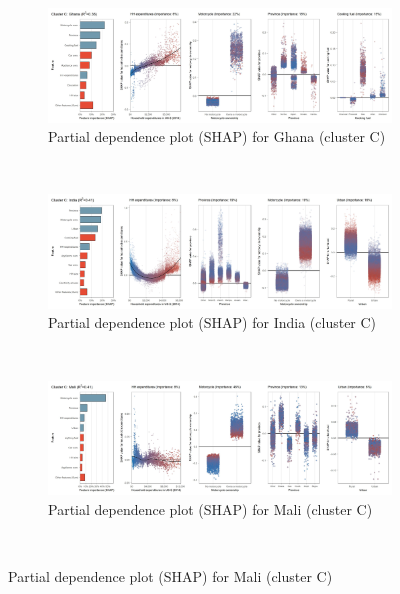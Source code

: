 \begin{figure}[ht!]\ContinuedFloat
    \centering
   \begin{subfigure}[b]{\textwidth} 
   \centering
         \caption{Partial dependence plot (SHAP) for Ghana (cluster C)}
         \label{fig:5b_GHA}
         \includegraphics[width=\textwidth]{Figure 5b/Figure_5b_GHA}
         \end{subfigure}
    \\
    \vspace{0.5cm}
    \begin{subfigure}[b]{\textwidth}
    \centering
         \caption{Partial dependence plot (SHAP) for India (cluster C)}
         \label{fig:5b_IND}
         \includegraphics[width=\textwidth]{Figure 5b/Figure_5b_IND}    
   \end{subfigure}
    \\
    \vspace{0.5cm}
   \begin{subfigure}[b]{\textwidth}
   \centering
         \caption{Partial dependence plot (SHAP) for Mali (cluster C)}
         \label{fig:5b_MLI}
         \includegraphics[width=\textwidth]{Figure 5b/Figure_5b_MLI}    
   \end{subfigure}
    \\
    \vspace{0.5cm}
   

\end{figure}
